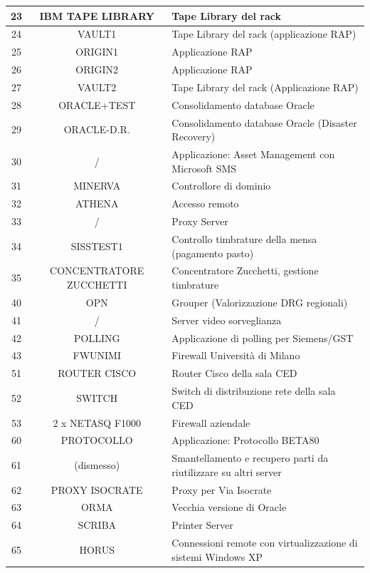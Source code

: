 \documentclass[12pt, a4paper, titlepage]{report}
\begin{document}
\begin{longtable}{| c | c | p{6cm} |}
				23 & IBM TAPE LIBRARY & Tape Library del rack \\ \hline
				24 & VAULT1 & Tape Library del rack (applicazione RAP) \\ \hline
				25 & ORIGIN1 & Applicazione RAP \\ \hline
				26 & ORIGIN2 & Applicazione RAP \\ \hline
				27 & VAULT2 & Tape Library del rack (Applicazione RAP) \\ \hline
				28 & ORACLE+TEST & Consolidamento database Oracle \\ \hline
				29 & ORACLE-D.R. & Consolidamento database Oracle (Disaster Recovery) \\ \hline
				30 & / & Applicazione: Asset Management con Microsoft SMS \\ \hline
				31 & MINERVA & Controllore di dominio \\ \hline
				32 & ATHENA & Accesso remoto \\ \hline
				33 & / & Proxy Server \\ \hline
				34 & SISSTEST1 & Controllo timbrature della mensa (pagamento pasto) \\ \hline
				35 & CONCENTRATORE ZUCCHETTI & Concentratore Zucchetti, gestione timbrature \\ \hline
				40 & OPN & Grouper (Valorizzazione DRG regionali) \\ \hline 
				41 & / & Server video sorveglianza \\ \hline
				42 & POLLING & Applicazione di polling per Siemens/GST \\ \hline
				43 & FWUNIMI & Firewall Università di Milano \\ \hline
				51 & ROUTER CISCO & Router Cisco della sala CED \\ \hline
				52 & SWITCH & Switch di distribuzione rete della sala CED \\ \hline
				53 & 2 x NETASQ F1000 & Firewall aziendale \\ \hline
				60 & PROTOCOLLO & Applicazione: Protocollo BETA80 \\ \hline
				61 & (dismesso) & Smantellamento e recupero parti da riutilizzare su altri server \\ \hline
				62 & PROXY ISOCRATE & Proxy per Via Isocrate \\ \hline
				63 & ORMA & Vecchia versione di Oracle \\ \hline
				64 & SCRIBA & Printer Server \\ \hline
				65 & HORUS & Connessioni remote con virtualizzazione di sistemi Windows XP \\ \hline

\end{longtable}
\end{document}
